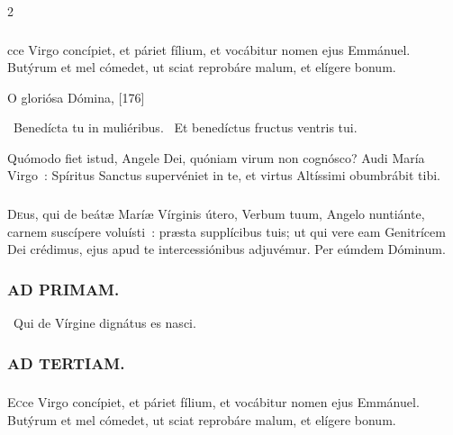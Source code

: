 \documentclass[9pt,twoside]{extarticle}
\begin{document}
\begin{multicols}{2}
{\subsubsection*{}
cce Virgo concípiet, et páriet fílium, et vocábitur nomen ejus Emmánuel. Butýrum et mel cómedet, ut sciat reprobáre malum, et elígere bonum.

\begin{tightlist}{}
\item {} O gloriósa Dómina,  [176]
\item {}~Benedícta tu in muliéribus. ~Et benedíctus fructus ventris tui.
\item {} Quómodo fiet istud, Angele Dei, quóniam virum non cognósco? Audi María Virgo~: Spíritus Sanctus supervéniet in te, et virtus Altíssimi obumbrábit tibi.
\end{tightlist}

\subsubsection*{\center {}}
\lettrine{D}eus, qui de beátæ Maríæ Vírginis útero, Verbum tuum, Angelo nuntiánte, carnem suscípere voluísti~: præsta supplícibus tuis; ut qui vere eam Genitrícem Dei crédimus, ejus apud te intercessiónibus adjuvémur. Per eúmdem Dóminum.

\begin{tightlist}{}
\item {}
\end{tightlist}

\subsubsection*{\center \textsc{AD PRIMAM.}}
\noindent {}~Qui de Vírgine dignátus es nasci.

\subsubsection*{\center \textsc{AD TERTIAM.}}
\subsubsection*{}
\lettrine{E}cce Virgo concípiet, et páriet fílium, et vocábitur nomen ejus Emmánuel. Butýrum et mel cómedet, ut sciat reprobáre malum, et elígere bonum.

}
\end{multicols}
\end{document}
